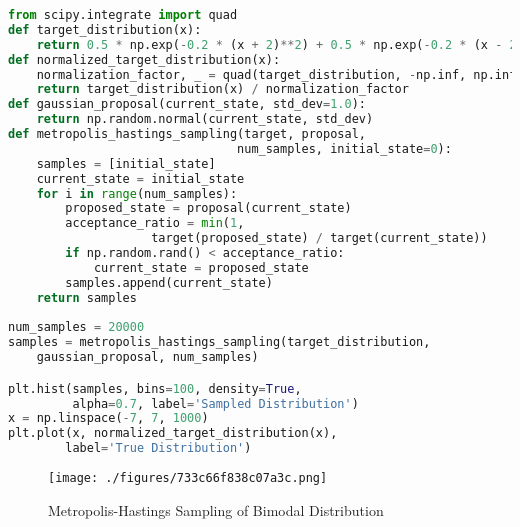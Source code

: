 \begin{lstlisting}[language=python]
from scipy.integrate import quad
def target_distribution(x):
    return 0.5 * np.exp(-0.2 * (x + 2)**2) + 0.5 * np.exp(-0.2 * (x - 2)**2)
def normalized_target_distribution(x):
    normalization_factor, _ = quad(target_distribution, -np.inf, np.inf)
    return target_distribution(x) / normalization_factor
def gaussian_proposal(current_state, std_dev=1.0):
    return np.random.normal(current_state, std_dev)
def metropolis_hastings_sampling(target, proposal, 
                                num_samples, initial_state=0):
    samples = [initial_state]
    current_state = initial_state
    for i in range(num_samples):
        proposed_state = proposal(current_state)
        acceptance_ratio = min(1, 
                    target(proposed_state) / target(current_state))
        if np.random.rand() < acceptance_ratio:
            current_state = proposed_state
        samples.append(current_state)
    return samples
    
num_samples = 20000
samples = metropolis_hastings_sampling(target_distribution, 
    gaussian_proposal, num_samples)

plt.hist(samples, bins=100, density=True,
         alpha=0.7, label='Sampled Distribution')
x = np.linspace(-7, 7, 1000)
plt.plot(x, normalized_target_distribution(x),
        label='True Distribution')
\end{lstlisting}

\begin{figure}[ht]
\centering
\texttt{[image: ./figures/733c66f838c07a3c.png]}
\caption{Metropolis-Hastings Sampling of Bimodal Distribution} \label{fig_MCMC_1}
\end{figure}

